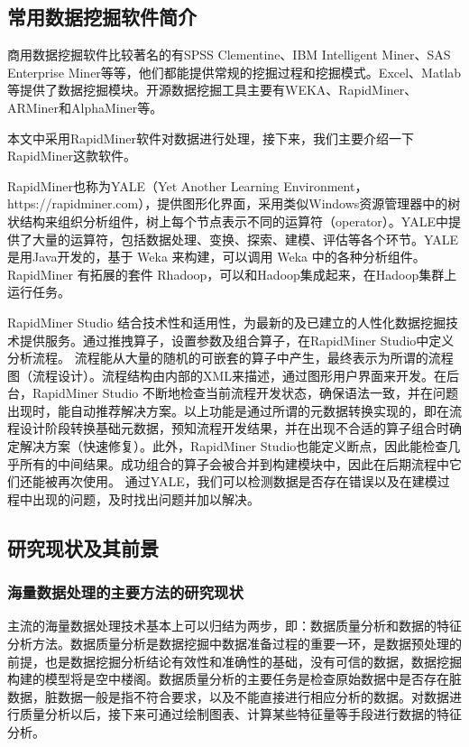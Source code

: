 \subsection{常用数据挖掘软件简介}
商用数据挖掘软件比较著名的有SPSS Clementine、IBM  Intelligent Miner、SAS Enterprise Miner等等，他们都能提供常规的挖掘过程和挖掘模式。Excel、Matlab等提供了数据挖掘模块。开源数据挖掘工具主要有WEKA、RapidMiner、ARMiner和AlphaMiner等。

本文中采用RapidMiner软件对数据进行处理，接下来，我们主要介绍一下RapidMiner这款软件。

RapidMiner也称为YALE（Yet Another Learning Environment，https://rapidminer.com），提供图形化界面，采用类似Windows资源管理器中的树状结构来组织分析组件，树上每个节点表示不同的运算符（operator）。YALE中提供了大量的运算符，包括数据处理、变换、探索、建模、评估等各个环节。YALE是用Java开发的，基于 Weka 来构建，可以调用 Weka 中的各种分析组件。RapidMiner 有拓展的套件 Rhadoop，可以和Hadoop集成起来，在Hadoop集群上运行任务。

RapidMiner Studio 结合技术性和适用性，为最新的及已建立的人性化数据挖掘技术提供服务。通过推拽算子，设置参数及组合算子，在RapidMiner Studio中定义分析流程。 流程能从大量的随机的可嵌套的算子中产生，最终表示为所谓的流程图（流程设计）。流程结构由内部的XML来描述，通过图形用户界面来开发。在后台，RapidMiner Studio 不断地检查当前流程开发状态，确保语法一致，并在问题出现时，能自动推荐解决方案。以上功能是通过所谓的元数据转换实现的，即在流程设计阶段转换基础元数据，预知流程开发结果，并在出现不合适的算子组合时确定解决方案（快速修复）。此外，RapidMiner Studio也能定义断点，因此能检查几乎所有的中间结果。成功组合的算子会被合并到构建模块中，因此在后期流程中它们还能被再次使用。
通过YALE，我们可以检测数据是否存在错误以及在建模过程中出现的问题，及时找出问题并加以解决。


\subsection{研究现状及其前景}
\subsubsection{海量数据处理的主要方法的研究现状}

主流的海量数据处理技术基本上可以归结为两步，即：数据质量分析和数据的特征分析方法。数据质量分析是数据挖掘中数据准备过程的重要一环，是数据预处理的前提，也是数据挖掘分析结论有效性和准确性的基础，没有可信的数据，数据挖掘构建的模型将是空中楼阁。数据质量分析的主要任务是检查原始数据中是否存在脏数据，脏数据一般是指不符合要求，以及不能直接进行相应分析的数据。对数据进行质量分析以后，接下来可通过绘制图表、计算某些特征量等手段进行数据的特征分析。


